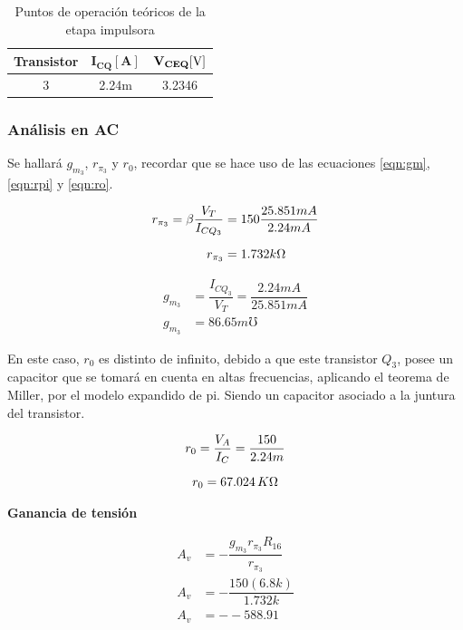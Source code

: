 \begin{enumerate}
        \begin{table}[H]
          \centering
          \begin{tabular}{|c |c |c|}
            \hline %
            \textbf{Transistor} & $\mathbf{I_{CQ}[ A]}$ & $\mathbf{V_{CEQ}[\volt]}$ \\
            \hline
            3                   & 2.24m                 & 3.2346                    \\
            \hline
          \end{tabular}
          \caption{Puntos de operación teóricos de la etapa impulsora}
          \label{tab:ptos_ei}
        \end{table}

        \subsubsection{Análisis en AC}
        Se hallará $g_{m_3}$, $r_{\pi_3}$ y $r_0$, recordar que se hace uso de las ecuaciones \ref{eqn:gm}, \ref{eqn:rpi} y \ref{eqn:ro}.

        \begin{align*}
          r_{\pi_3}= \beta \dfrac{V_T}{I_{CQ_3}} & =150 \dfrac{25.851 mA}{2.24 mA} \nonumber \\[0.2cm]
          r_{\pi_3}                              & =1.732k \ohm
        \end{align*}

        \begin{align*}
          g_{m_3} & =\dfrac{I_{CQ_3}}{V_T}=\dfrac{2.24m A}{25.851 mA} \nonumber \\[0.2cm]
          g_{m_3} & =86.65m \mho
        \end{align*}

        En este caso, $r_0$ es distinto de infinito, debido a que este transistor $Q_3$, posee un capacitor que se tomará en cuenta en altas frecuencias, aplicando el teorema de Miller, por el modelo expandido de pi. Siendo un capacitor asociado a la juntura del transistor.

        \begin{gather}
          r_0=\dfrac{V_A}{I_C}=\dfrac{150}{2.24m} \nonumber \\[0.2cm]
          r_0=67.024 \, K\ohm
        \end{gather}

        \textbf{Ganancia de tensión}

        \begin{align*}
          A_v & =- \dfrac{g_{m_3}r_{\pi_3}R_{16}}{r_{\pi_3}} \\[0.2cm]
          A_v & =- \dfrac{150(6.8k)}{1.732k}                 \\[0.2cm]
          A_v & =- -588.91                                   \\[0.2cm]
        \end{align*}


\end{enumerate}
